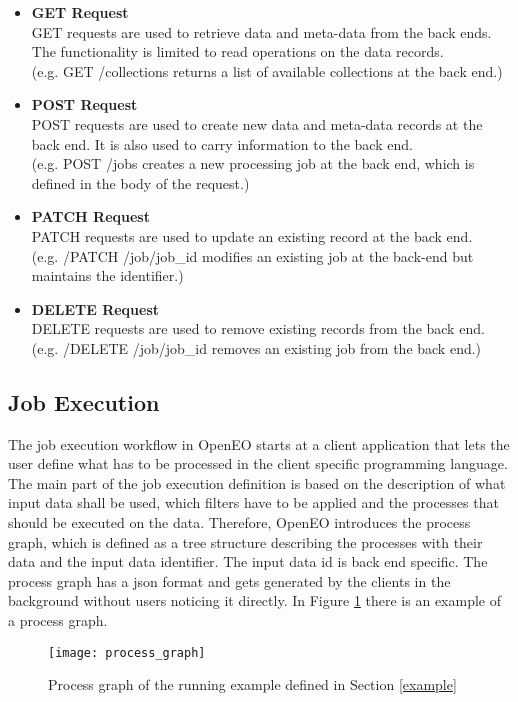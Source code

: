 \documentclass[draft,final]{vutinfth} %
\begin{document}
\begin{itemize}
	\item \textbf{GET Request} \\
	GET requests are used to retrieve data and meta-data from the back ends. The functionality is limited to read operations on the data records. \\(e.g. GET /collections returns a list of available collections at the back end.)
	\item \textbf{POST Request} \\ 
	POST requests are used to create new data and meta-data records at the back end. It is also used to carry information to the back end.  \\(e.g. POST /jobs creates a new processing job at the back end, which is defined in the body of the request.)  
	\item \textbf{PATCH Request} \\
	PATCH requests are used to update an existing record at the back end. \\(e.g. /PATCH /job/{job\_id} modifies an existing job at the back-end but maintains the identifier.)
	\item \textbf{DELETE Request} \\ 
	DELETE requests are used to remove existing records from the back end. \\(e.g. /DELETE /job/{job\_id} removes an existing job from the back end.)
\end{itemize}

\subsection{Job Execution}\label{Job Execution}
The job execution workflow in OpenEO starts at a client application that lets the user define what has to be processed in the client specific programming language.
The main part of the job execution definition is based on the description of what input data shall be used, which filters have to be applied and the processes that should be executed on the data. Therefore, OpenEO introduces the process graph, which is defined as a tree structure describing the processes with their data and the input data identifier. The input data id is back end specific. The process graph has a \gls{json} format and gets generated by the clients in the background without users noticing it directly. In Figure \ref{fig:process_graph} there is an example of a process graph. 

\begin{figure}[h]
	\centering
	\texttt{[image: process\_graph]}
	\caption{Process graph of the running example defined in Section \ref{example}}
	\label{fig:process_graph} %
\end{figure}
\end{document}
